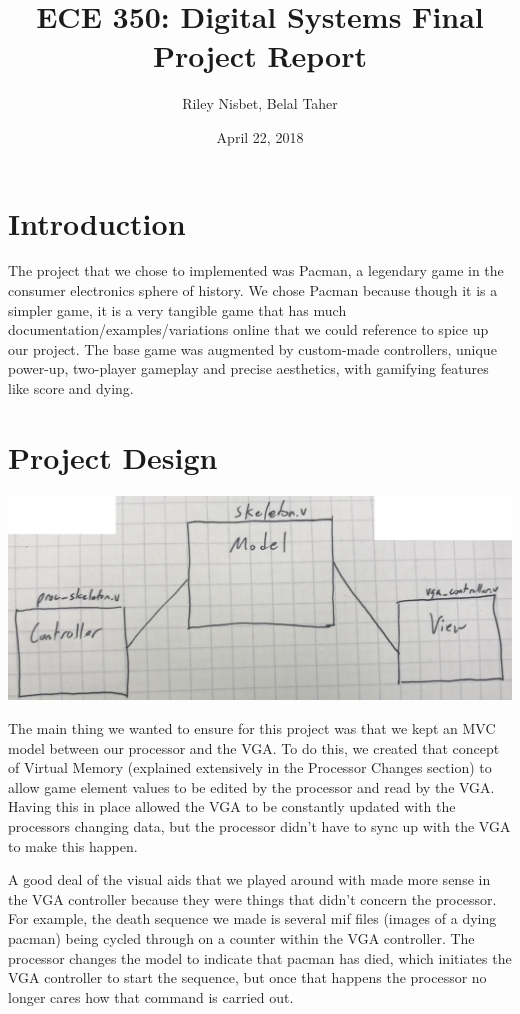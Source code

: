 \documentclass[letterpaper]{article} %
\begin{document}
\title{ECE 350: Digital Systems Final Project Report}
\author{Riley Nisbet, Belal Taher} %
\date{April 22, 2018} %
\maketitle

\section{Introduction}\par
	The project that we chose to implemented was Pacman, a legendary game in the consumer electronics sphere of history. We chose Pacman because though it is a simpler game, it is a very tangible game that has much documentation/examples/variations online that we could reference to spice up our project. The base game was augmented by custom-made controllers, unique power-up, two-player gameplay and precise aesthetics, with gamifying features like score and dying. \par
	
\section{Project Design}
	\begin{center}
		\includegraphics[scale=.05]{MVC}
	\end{center}\par
	The main thing we wanted to ensure for this project was that we kept an MVC model between our processor and the VGA. To do this, we created that concept of Virtual Memory (explained extensively in the Processor Changes section) to allow game element values to be edited by the processor and read by the VGA. Having this in place allowed the VGA to be constantly updated with the processors changing data, but the processor didn't have to sync up with the VGA to make this happen. \par
	A good deal of the visual aids that we played around with made more sense in the VGA controller because they were things that didn't concern the processor. For example, the death sequence we made is several mif files (images of a dying pacman) being cycled through on a counter within the VGA controller. The processor changes the model to indicate that pacman has died, which initiates the VGA controller to start the sequence, but once that happens the processor no longer cares how that command is carried out. \par
	
\end{document}
